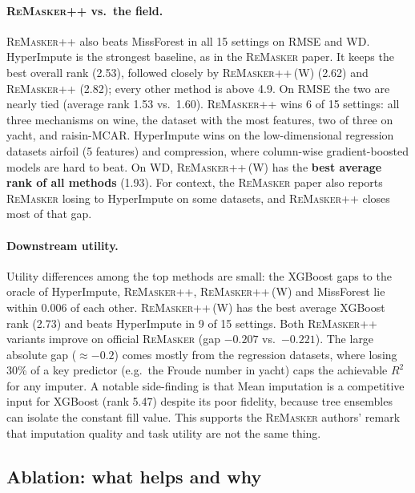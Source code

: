 \documentclass[11pt]{article}
\newcommand{\rmpp}{\textsc{ReMasker++}}
\newcommand{\remasker}{\textsc{ReMasker}}
\begin{document}
\paragraph{\rmpp{} vs.\ the field.} \rmpp{} also beats MissForest in all 15 settings on RMSE and WD. HyperImpute is the strongest baseline, as in the \remasker{} paper. It keeps the best overall rank (2.53), followed closely by \rmpp{}\,(W) (2.62) and \rmpp{} (2.82); every other method is above 4.9. On RMSE the two are nearly tied (average rank 1.53 vs.\ 1.60). \rmpp{} wins 6 of 15 settings: all three mechanisms on wine, the dataset with the most features, two of three on yacht, and raisin-MCAR. HyperImpute wins on the low-dimensional regression datasets airfoil (5 features) and compression, where column-wise gradient-boosted models are hard to beat. On WD, \rmpp{}\,(W) has the \textbf{best average rank of all methods} (1.93). For context, the \remasker{} paper also reports \remasker{} losing to HyperImpute on some datasets, and \rmpp{} closes most of that gap.

\paragraph{Downstream utility.} Utility differences among the top methods are small: the XGBoost gaps to the oracle of HyperImpute, \rmpp{}, \rmpp{}\,(W) and MissForest lie within 0.006 of each other. \rmpp{}\,(W) has the best average XGBoost rank (2.73) and beats HyperImpute in 9 of 15 settings. Both \rmpp{} variants improve on official \remasker{} (gap $-0.207$ vs.\ $-0.221$). The large absolute gap ($\approx -0.2$) comes mostly from the regression datasets, where losing 30\% of a key predictor (e.g.\ the Froude number in yacht) caps the achievable $R^2$ for any imputer. A notable side-finding is that Mean imputation is a competitive input for XGBoost (rank 5.47) despite its poor fidelity, because tree ensembles can isolate the constant fill value. This supports the \remasker{} authors' remark that imputation quality and task utility are not the same thing.

\subsection{Ablation: what helps and why}
\begin{table}[h]
\centering\small
\resizebox{\linewidth}{!}{}
\caption{Ablation (average over 5 datasets $\times$ 3 mechanisms $\times$ 3 seeds). $\Delta$ = mean per-setting relative change vs.\ official \remasker{} (negative is better). Letters refer to Section~3.}
\label{tab:abl}
\end{table}
\end{document}
